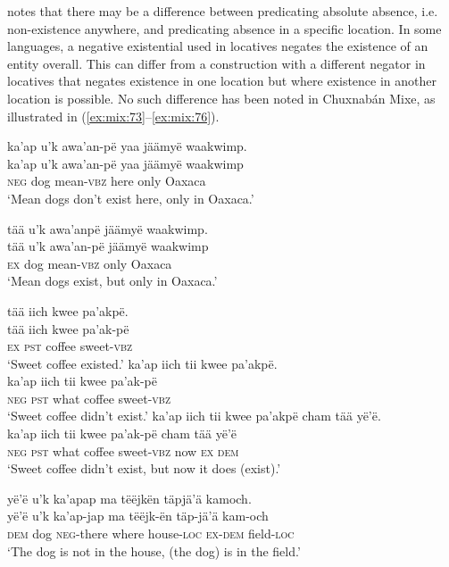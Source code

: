 \documentclass[output=paper,colorlinks,citecolor=brown,draft]{langscibook}
\begin{document}
\citet[123--124]{Veselinova2013neg.exist} notes that there may be a difference between predicating absolute absence, i.e. non-existence anywhere, and predicating absence in a specific location. In some languages, a negative existential used in locatives negates the existence of an entity overall. This can differ from a construction with a different negator in locatives that negates existence in one location but where existence in another location is possible. No such difference has been noted in Chuxnabán Mixe, as illustrated in (\ref{ex:mix:73}--\ref{ex:mix:76}).

\ea\label{ex:mix:73}
    \glll ka’ap u’k awa’an-pë yaa jäämyë waakwimp.\\
        ka’ap u’k awa’an-pë yaa jäämyë waakwimp\\
        \textsc{neg} dog mean-\textsc{vbz} here only Oaxaca\\
    \glt ‘Mean dogs don’t exist here, only in Oaxaca.’
\z

\ea\label{ex:mix:74}
    \glll tää u’k awa’anpë jäämyë waakwimp.\\
        tää u’k awa’an-pë jäämyë waakwimp\\
        \textsc{ex} dog mean-\textsc{vbz} only Oaxaca\\
    \glt ‘Mean dogs exist, but only in Oaxaca.’
\z
 
\ea\label{ex:mix:75}
    \ea\label{ex:mix:75a}
        \glll tää iich kwee pa’akpë.\\ 
              tää iich kwee pa’ak-pë\\
             \textsc{ex} \textsc{pst} coffee sweet-\textsc{vbz} \\
        \glt ‘Sweet coffee existed.’
    \ex\label{ex:mix:75b}
        \glll  ka’ap iich tii kwee pa’akpë.\\
             ka’ap iich tii kwee pa’ak-pë\\
             \textsc{neg} \textsc{pst} what coffee sweet-\textsc{vbz}\\
        \glt ‘Sweet coffee didn’t exist.’
    \ex\label{ex:mix:75c}
        \glll ka’ap iich tii kwee pa’akpë cham tää yë’ë.\\
             ka’ap iich tii kwee pa’ak-pë cham tää yë’ë\\
             \textsc{neg} \textsc{pst} what coffee sweet-\textsc{vbz} now \textsc{ex} \textsc{dem}\\
        \glt ‘Sweet coffee didn’t exist, but now it does (exist).’
    \z
\z 

\ea\label{ex:mix:76}
    \glll yë’ë u’k ka’apap ma tëëjkën täpjä’ä kamoch.\\
        yë’ë u’k ka’ap-jap ma tëëjk-ën täp-jä’ä kam-och\\
        \textsc{dem} dog \textsc{neg}{}-there where house-\textsc{loc} \textsc{ex-dem} field-\textsc{loc}\\
    \glt ‘The dog is not in the house, (the dog) is in the field.’
\z
\end{document}
